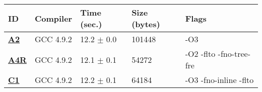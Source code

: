     \begin{tabular}{|l|l|l|l|p{3.2in}|}
     \hline
      \textbf{ID} & \textbf{Compiler} & \textbf{Time (sec.)} & \textbf{Size (bytes)} & \textbf{Flags} \\ 
     \hline
      \textbf{ \href{http://cknowledge.org/repo/web.php?wcid=experiment:9b2b24a80c45aa9b\&subpoint=eb28149e9a71762d}{A2} } &  GCC 4.9.2  &  12.2 $\pm$ 0.0  &  101448  & {\small -O3 }\\
     \hline
      \textbf{ \href{http://cknowledge.org/repo/web.php?wcid=experiment:f5489592a3a15bf3\&subpoint=6236b2e4742629aa}{A4R} } &  GCC 4.9.2  &  12.1 $\pm$ 0.1  &  54272  & {\small -O2 -flto -fno-tree-fre }\\
     \hline
      \textbf{ \href{http://cknowledge.org/repo/web.php?wcid=experiment:dfc49b5be33c1813\&subpoint=ec6a2e99da2e3445}{C1} } &  GCC 4.9.2  &  12.2 $\pm$ 0.1  &  64184  & {\small -O3 -fno-inline -flto }\\
     \hline
    \end{tabular}    